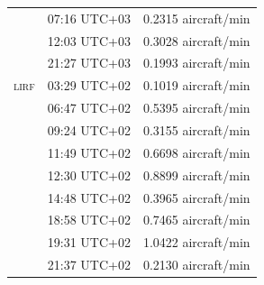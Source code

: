 \documentclass[]{elsarticle}
\newcommand{\airp}[1]{\textcolor{#1}{\textsc{#1}}}
\begin{document}
\begin{center}
\begin{longtable}{lll}
           & 07:16 UTC+03 &  0.2315 aircraft/min \\
           & 12:03 UTC+03 &  0.3028 aircraft/min \\
           & 21:27 UTC+03 &  0.1993 aircraft/min \\
      \airp{lirf} & 03:29 UTC+02 &  0.1019 aircraft/min \\
           & 06:47 UTC+02 &  0.5395 aircraft/min \\
           & 09:24 UTC+02 &  0.3155 aircraft/min \\
           & 11:49 UTC+02 &  0.6698 aircraft/min \\
           & 12:30 UTC+02 &  0.8899 aircraft/min \\
           & 14:48 UTC+02 &  0.3965 aircraft/min \\
           & 18:58 UTC+02 &  0.7465 aircraft/min \\
           & 19:31 UTC+02 &  1.0422 aircraft/min \\
           & 21:37 UTC+02 &  0.2130 aircraft/min \\
    \end{longtable}
  \end{center}
\end{document}
